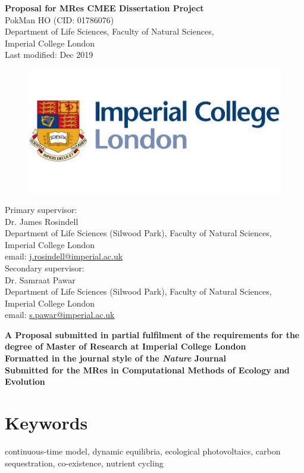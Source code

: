 \documentclass[a4paper, 11pt]{article}
\title{\ReportTitle}
\author{\ReportAuthor}
\date{}
\newcommand{\ReportTitle}{Proposal for MRes CMEE Dissertation Project}
\newcommand{\ReportAuthor}{PokMan HO (CID: 01786076)}
\newcommand{\ReportAffil}{Department of Life Sciences, Faculty of Natural Sciences,\\Imperial College London}
\newcommand{\Disclaim}{\textbf{A Proposal submitted in partial fulfilment of the requirements for the degree of Master of Research at Imperial College London\\\vspace{1cm}
		Formatted in the journal style of the \textit{Nature} Journal\\
		Submitted for the MRes in Computational Methods of Ecology and Evolution}}
\begin{document}
	\begin{center}
		\Huge\textbf{\ReportTitle}\\
		\LARGE\ReportAuthor\\
		\Large\ReportAffil\\
		\Large{Last modified: Dec 2019}
	\end{center}
	\begin{figure}[h]
		\centering\includegraphics[width=\linewidth]{icl.jpg}
	\end{figure}
Primary supervisor:\\
\indent Dr. James Rosindell\\
\indent Department of Life Sciences (Silwood Park), Faculty of Natural Sciences, Imperial College London\\
\indent email: \href{mailto:j.rosindell@imperial.ac.uk}{j.rosindell@imperial.ac.uk}\\
Secondary supervisor:\\
\indent Dr. Samraat Pawar\\
\indent Department of Life Sciences (Silwood Park), Faculty of Natural Sciences, Imperial College London\\
\indent email: \href{mailto:s.pawar@imperial.ac.uk}{s.pawar@imperial.ac.uk}
\begin{center}
	\Large\Disclaim
\end{center}
\clearpage
\section{Keywords}
continuous-time model, dynamic equilibria, ecological photovoltaics, carbon sequestration, co-existence, nutrient cycling
\end{document}
